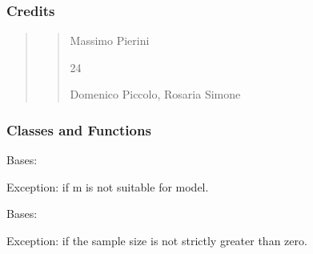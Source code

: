 \documentclass[letterpaper,10pt,english]{sphinxmanual}
\begin{document}
\subsubsection{Credits}
\label{\detokenize{cubmods:id75}}\begin{quote}
\begin{quote}\begin{description}
\sphinxAtStartPar
Massimo Pierini

\sphinxhyphen{}24

\sphinxAtStartPar
Domenico Piccolo, Rosaria Simone

\sphinxAtStartPar
{}

\end{description}\end{quote}
\end{quote}


\subsubsection{Classes and Functions}
\label{\detokenize{cubmods:id76}}

\begin{fulllineitems}
\label{\detokenize{cubmods:cubmods.general.InvalidCategoriesError}}
\pysigstartsignatures
{}
\pysigstopsignatures
\sphinxAtStartPar
Bases: 

\sphinxAtStartPar
Exception: if m is not suitable for model.

\end{fulllineitems}


\begin{fulllineitems}
\label{\detokenize{cubmods:cubmods.general.InvalidSampleSizeError}}
\pysigstartsignatures
{}
\pysigstopsignatures
\sphinxAtStartPar
Bases: 

\sphinxAtStartPar
Exception: if the sample size is not strictly greater than zero.

\end{fulllineitems}
\end{document}
